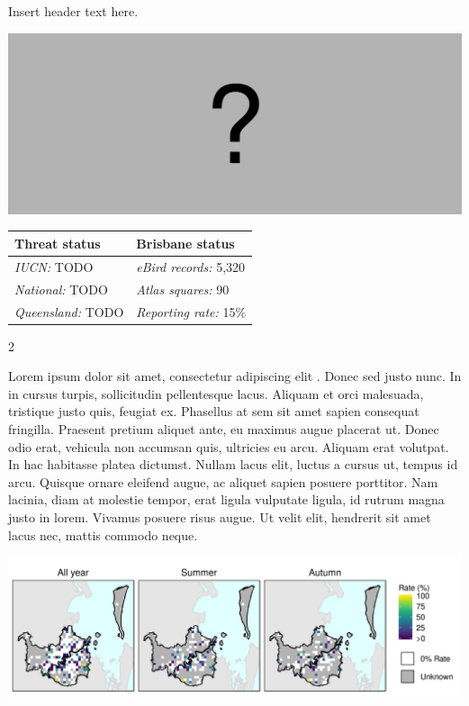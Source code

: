\documentclass[12pt,openany,oneside]{book}
\let\origfigure\figure
\let\endorigfigure\endfigure
\renewenvironment{figure}[1][2] {
  \expandafter\origfigure\expandafter[H]
} {
  \endorigfigure
}
\let\Begin\begin
\let\End\end
\theoremstyle{definition}
\theoremstyle{definition}
\theoremstyle{definition}
\theoremstyle{remark}
\begin{document}

Insert header text here.

\begin{figure}
\centering
\includegraphics[width=\textwidth,keepaspectratio=true]{assets/misc/missing-profile.png}
\caption{Insert caption here.}
\end{figure}

\begin{tabu} to 
\toprule
Threat status & Brisbane status\\
\midrule
\textit{IUCN:} TODO & \textit{eBird records:} 5,320\\
\textit{National:} TODO & \textit{Atlas squares:} 90\\
\textit{Queensland:} TODO & \textit{Reporting rate:} 15\%\\
\bottomrule
\end{tabu} 
\vspace{0.15cm}

\Begin{multicols}{2}

Lorem ipsum dolor sit amet, consectetur adipiscing elit
\citep{rexample1, rexample2, rexample3}. Donec sed justo nunc. In in
cursus turpis, sollicitudin pellentesque lacus. Aliquam et orci
malesuada, tristique justo quis, feugiat ex. Phasellus at sem sit amet
sapien consequat fringilla. Praesent pretium aliquet ante, eu maximus
augue placerat ut. Donec odio erat, vehicula non accumsan quis,
ultricies eu arcu. Aliquam erat volutpat. In hac habitasse platea
dictumst. Nullam lacus elit, luctus a cursus ut, tempus id arcu. Quisque
ornare eleifend augue, ac aliquet sapien posuere porttitor. Nam lacinia,
diam at molestie tempor, erat ligula vulputate ligula, id rutrum magna
justo in lorem. Vivamus posuere risus augue. Ut velit elit, hendrerit
sit amet lacus nec, mattis commodo neque.

\End{multicols}

\clearpage

\begin{figure}
\centering
\includegraphics[height=0.47\textheight,width=\textwidth,keepaspectratio=true]{assets/maps/Aythya-australis.png}
\end{figure}
\end{document}
